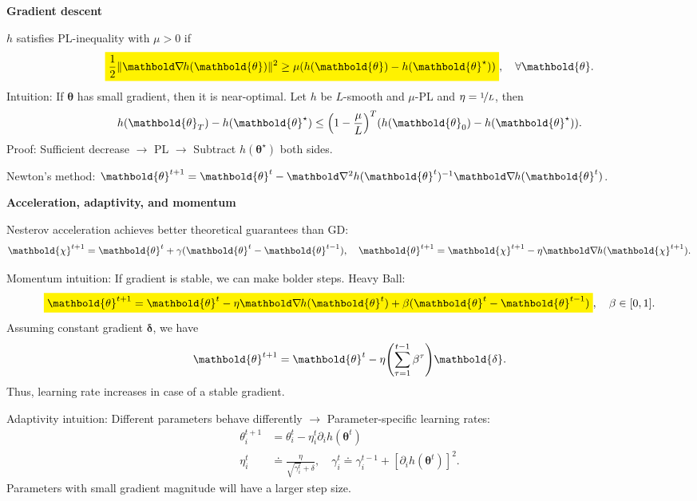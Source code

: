 \documentclass[10pt]{article}
\newenvironment{topic}[1]
{\textbf{\sffamily \footnotesize \colorbox{black}{\rlap{\textbf{\textcolor{white}{#1}}}\hspace{\linewidth}\hspace{-2\fboxsep}}}}
{}
\newenvironment{subtopic}[1]
{\begin{center}\textbf{\footnotesize \sffamily #1}\end{center}}
{}
\renewcommand{\vec}[1]{\ensuremath{\mathbold{#1}}}
\begin{document}
\begin{multicols*}{3}
\begin{topic}{Gradient-based learning}
\begin{subtopic}{Gradient descent}
            $h$ satisfies PL-inequality with $\mu > 0$ if \[
                \colorbox{yellow}{$\displaystyle \frac{1}{2} \| \grad{h(\vec{\theta})}{} \|^2 \geq \mu (h(\vec{\theta}) - h(\vec{\theta}^\star))$}, \quad \forall \vec{\theta}.
            \]
            Intuition: If $\vec{\theta}$ has small gradient, then it is near-optimal. Let $h$ be $L$-smooth and
            $\mu$-PL and $\eta = \nicefrac{1}{L}$, then \[
                h(\vec{\theta}_T) - h(\vec{\theta}^\star) \leq \lft( 1 - \frac{\mu}{L} \rgt)^T (h(\vec{\theta}_0) - h(\vec{\theta}^\star)).
            \]
            Proof: Sufficient decrease $\to$ PL $\to$ Subtract $h(\vec{\theta}^\star)$ both sides.

            Newton's method: $\vec{\theta}^{t+1} = \vec{\theta}^t - \inv{\hess{h(\vec{\theta}^t)}{}} \grad{h(\vec{\theta}^t)}{}$.
            
        \end{subtopic}

        \begin{subtopic}{Acceleration, adaptivity, and momentum}
            Nesterov acceleration achieves better theoretical guarantees than GD: \[
                \vec{\chi}^{t+1} = \vec{\theta}^t + \gamma(\vec{\theta}^t - \vec{\theta}^{t-1}), \quad \vec{\theta}^{t+1} = \vec{\chi}^{t+1} - \eta \grad{h(\vec{\chi}^{t+1})}{}.
            \]

            Momentum intuition: If gradient is stable, we can make bolder steps. Heavy Ball: \[
                \colorbox{yellow}{$\displaystyle \vec{\theta}^{t+1} = \vec{\theta}^t - \eta \grad{h(\vec{\theta}^t)}{} + \beta (\vec{\theta}^t - \vec{\theta}^{t-1})$}, \quad \beta \in [0,1].
            \]
            Assuming constant gradient $\vec{\delta}$, we have \[
                \vec{\theta}^{t+1} = \vec{\theta}^t - \eta \lft( \sum_{\tau=1}^{t-1} \beta^{\tau} \rgt) \vec{\delta}.
            \]
            Thus, learning rate increases in case of a stable gradient.

            Adaptivity intuition: Different parameters behave differently $\to$ Parameter-specific learning
            rates:
            \begin{align*}
                \theta_i^{t+1} & = \theta_i^t - \eta_i^t \partial_i h(\vec{\theta}^t)                                                                       \\
                \eta_i^t       & \doteq \frac{\eta}{\sqrt{\gamma_i^t} + \delta}, \quad \gamma_i^t \doteq \gamma_i^{t-1} + [\partial_i h(\vec{\theta}^t)]^2.
            \end{align*}
            Parameters with small gradient magnitude will have a larger step size.


\end{subtopic}
\end{topic}
\end{multicols*}
\end{document}

